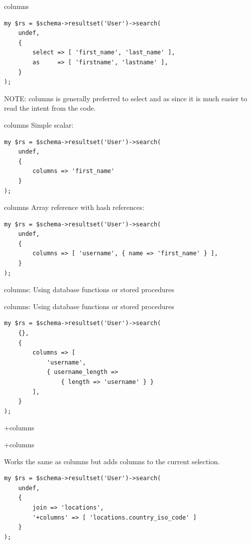 \begin{frame}[fragile]{columns}
\begin{lstlisting}
my $rs = $schema->resultset('User')->search(
    undef,
    {
        select => [ 'first_name', 'last_name' ],
        as     => [ 'firstname', 'lastname' ],
    }
);
\end{lstlisting}
\end{frame}

NOTE: columns is generally preferred to select and as since it is much
easier to read the intent from the code.

\begin{frame}[fragile]{columns}
Simple scalar:

\begin{lstlisting}
my $rs = $schema->resultset('User')->search(
    undef,
    {
        columns => 'first_name'
    }
);
\end{lstlisting}

\end{frame}

\begin{frame}[fragile]{columns}
Array reference with hash references:

\begin{lstlisting}
my $rs = $schema->resultset('User')->search(
    undef,
    {
        columns => [ 'username', { name => 'first_name' } ],
    }
);
\end{lstlisting}
\end{frame}

columns: Using database functions or stored procedures

\begin{frame}[fragile]{columns: Using database functions or stored
    procedures}
\begin{lstlisting}
my $rs = $schema->resultset('User')->search(
    {},
    {
        columns => [
            'username',
            { username_length => 
                { length => 'username' } }
        ],
    }
);
\end{lstlisting}
\end{frame}

+columns

\begin{frame}[fragile]{+columns}

Works the same as columns but adds columns to the current selection.

\begin{lstlisting}
my $rs = $schema->resultset('User')->search(
    undef,
    {
        join => 'locations',
        '+columns' => [ 'locations.country_iso_code' ]
    }
);
\end{lstlisting}
\end{frame}

